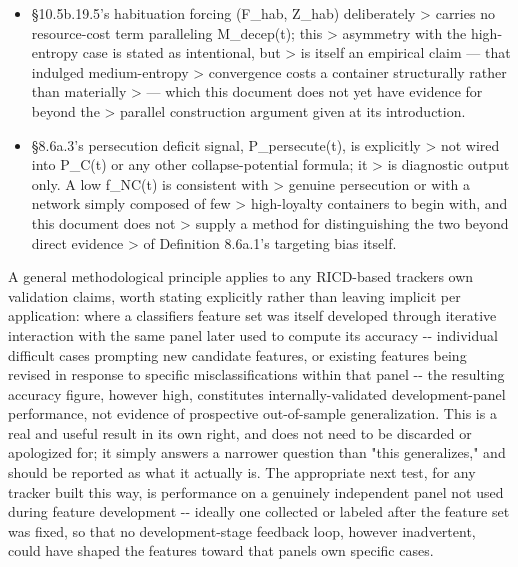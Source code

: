 \documentclass[
]{article}
\begin{document}
\begin{itemize}
  precisely, rising Γ\_glimpse(t) actually culminates in permanent
  \textgreater{} structural change; treating the gating conditions as
  necessary but \textgreater{} not jointly sufficient in closed form is
  a deliberate scope \textgreater{} limitation, not an oversight to be
  resolved by a future \textgreater{} coefficient fit alone.
\item
  §10.5b.19.5's habituation forcing (F\_hab, Z\_hab) deliberately
  \textgreater{} carries no resource-cost term paralleling M\_decep(t);
  this \textgreater{} asymmetry with the high-entropy case is stated as
  intentional, but \textgreater{} is itself an empirical claim --- that
  indulged medium-entropy \textgreater{} convergence costs a container
  structurally rather than materially \textgreater{} --- which this
  document does not yet have evidence for beyond the \textgreater{}
  parallel construction argument given at its introduction.
\item
  §8.6a.3's persecution deficit signal, P\_persecute(t), is explicitly
  \textgreater{} not wired into P\_C(t) or any other collapse-potential
  formula; it \textgreater{} is diagnostic output only. A low f\_NC(t)
  is consistent with \textgreater{} genuine persecution or with a
  network simply composed of few \textgreater{} high-loyalty containers
  to begin with, and this document does not \textgreater{} supply a
  method for distinguishing the two beyond direct evidence
  \textgreater{} of Definition 8.6a.1's targeting bias itself.
\end{itemize}

A general methodological principle applies to any RICD-based
tracker\textquotesingle s own validation claims, worth stating
explicitly rather than leaving implicit per application: where a
classifier\textquotesingle s feature set was itself developed through
iterative interaction with the same panel later used to compute its
accuracy -\/- individual difficult cases prompting new candidate
features, or existing features being revised in response to specific
misclassifications within that panel -\/- the resulting accuracy figure,
however high, constitutes internally-validated development-panel
performance, not evidence of prospective out-of-sample generalization.
This is a real and useful result in its own right, and does not need to
be discarded or apologized for; it simply answers a narrower question
than "this generalizes," and should be reported as what it actually is.
The appropriate next test, for any tracker built this way, is
performance on a genuinely independent panel not used during feature
development -\/- ideally one collected or labeled after the feature set
was fixed, so that no development-stage feedback loop, however
inadvertent, could have shaped the features toward that
panel\textquotesingle s own specific cases.
\end{document}
